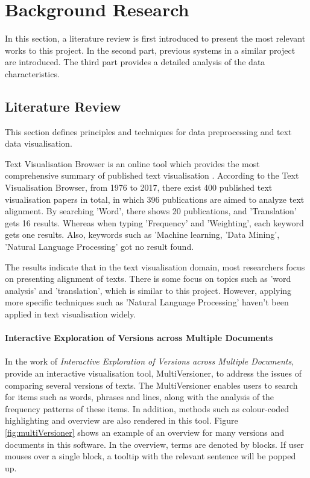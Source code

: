 \clearpage
\section{Background Research}

In this section, a literature review is first introduced to present the most relevant works to this project. In the second part, previous systems in a similar project are introduced. The third part provides a detailed analysis of the data characteristics.

\subsection{Literature Review}

This section defines principles and techniques for data preprocessing and text data visualisation.

Text Visualisation Browser \cite{Kucher2014} is an online tool which provides the most comprehensive summary of published text visualisation \cite{Cao2016}. According to the Text Visualisation Browser, from 1976 to 2017, there exist 400 published text visualisation papers in total, in which 396 publications are aimed to analyze text alignment. By searching ’Word’, there shows 20 publications, and ’Translation’ gets 16 results. Whereas when typing ’Frequency’ and ’Weighting’, each keyword gets one results. Also, keywords such as ’Machine learning, ’Data Mining’, 'Natural Language Processing' got no result found. 

The results indicate that in the text visualisation domain, most researchers focus on presenting alignment of texts. There is some focus on topics such as ’word analysis’ and ’translation’, which is similar to this project. However, applying more specific techniques such as ’Natural Language Processing’ haven’t been applied in text visualisation widely.


\paragraph{Interactive Exploration of Versions across Multiple Documents}

\paragraph[]{}In the work of \emph{Interactive Exploration of Versions across Multiple Documents}, \cite{Jong2008} provide an interactive visualisation tool,
MultiVersioner, to address the issues of comparing several versions of texts. The MultiVersioner enables users to search for items such as words, phrases and lines, along with the analysis of the frequency patterns of these items. In addition, methods such as colour-coded highlighting and overview are also rendered in this tool. Figure \ref{fig:multiVersioner} shows an example of an overview for many versions and documents in this software. In the overview, terms are denoted by blocks. If user mouses over a single block, a tooltip with the relevant sentence will be popped up.

